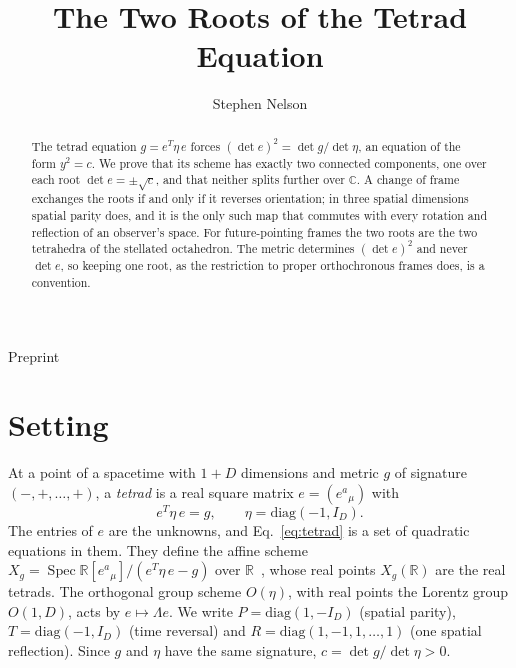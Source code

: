 \documentclass[twocolumn]{iopjournal}
\renewcommand{\articletype}[1]{%
  {\vspace*{-8mm}\noindent \Large \sf Preprint}\par
  \vspace*{6mm}\noindent{\scriptsize \sf{\bfseries \MakeUppercase{#1}}}}
\begin{document}
\articletype{Supplementary Material}

\title{The Two Roots of the Tetrad Equation}

\author{Stephen Nelson}



\begin{abstract}
The tetrad equation $g = e^T \eta\, e$ forces
$(\det e)^2 = \det g / \det \eta$, an equation of the form
$y^2 = c$. We prove that its scheme has exactly two connected
components, one over each root $\det e = \pm\sqrt{c}$, and that
neither splits further over $\mathbb{C}$. A change of frame exchanges
the roots if and only if it reverses orientation; in three spatial
dimensions spatial parity does, and it is the only such map that
commutes with every rotation and reflection of an observer's space.
For future-pointing frames the two roots are the two tetrahedra of the
stellated octahedron. The metric determines $(\det e)^2$ and never
$\det e$, so keeping one root, as the restriction to proper
orthochronous frames does, is a convention.
\end{abstract}



\section*{Setting}

At a point of a spacetime with $1 + D$ dimensions and metric $g$ of
signature $(-, +, \dots, +)$, a \emph{tetrad} is a real square matrix
$e = (e^a{}_\mu)$ with
\begin{equation}
  e^T \eta\, e = g, \qquad \eta = \mathrm{diag}(-1, I_D).
  \label{eq:tetrad}
\end{equation}
The entries of $e$ are the unknowns, and Eq.~\eqref{eq:tetrad} is a
set of quadratic equations in them. They define the affine scheme
$X_g = \operatorname{Spec} \mathbb{R}[e^a{}_\mu]/(e^T \eta\, e - g)$
over $\mathbb{R}$~\cite{Grothendieck1960,Hartshorne1977}, whose real points $X_g(\mathbb{R})$ are the real tetrads. The
orthogonal group scheme $O(\eta)$, with real points the Lorentz group
$O(1,D)$, acts by $e \mapsto \Lambda e$. We write
$P = \mathrm{diag}(1, -I_D)$ (spatial parity),
$T = \mathrm{diag}(-1, I_D)$ (time reversal) and
$R = \mathrm{diag}(1, -1, 1, \dots, 1)$ (one spatial reflection).
Since $g$ and $\eta$ have the same signature,
$c = \det g / \det \eta > 0$.
\end{document}
